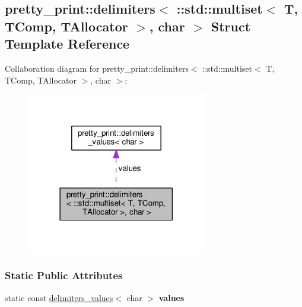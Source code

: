 \hypertarget{structpretty__print_1_1delimiters_3_01_1_1std_1_1multiset_3_01T_00_01TComp_00_01TAllocator_01_4_00_01char_01_4}{}\subsection{pretty\+\_\+print\+:\+:delimiters$<$ \+:\+:std\+:\+:multiset$<$ T, T\+Comp, T\+Allocator $>$, char $>$ Struct Template Reference}
\label{structpretty__print_1_1delimiters_3_01_1_1std_1_1multiset_3_01T_00_01TComp_00_01TAllocator_01_4_00_01char_01_4}


Collaboration diagram for pretty\+\_\+print\+:\+:delimiters$<$ \+:\+:std\+:\+:multiset$<$ T, T\+Comp, T\+Allocator $>$, char $>$\+:
\nopagebreak
\begin{figure}[H]
\begin{center}
\leavevmode
\includegraphics[width=222pt]{structpretty__print_1_1delimiters_3_01_1_1std_1_1multiset_3_01T_00_01TComp_00_01TAllocator_01_4_00_01char_01_4__coll__graph}
\end{center}
\end{figure}
\subsubsection*{Static Public Attributes}
\begin{DoxyCompactItemize}
\item 
static const \hyperlink{structpretty__print_1_1delimiters__values}{delimiters\+\_\+values}$<$ char $>$ {\bfseries values}\hypertarget{structpretty__print_1_1delimiters_3_01_1_1std_1_1multiset_3_01T_00_01TComp_00_01TAllocator_01_4_00_01char_01_4_a1519f24d4d3b7d4e0eeb73316c79bf35}{}\label{structpretty__print_1_1delimiters_3_01_1_1std_1_1multiset_3_01T_00_01TComp_00_01TAllocator_01_4_00_01char_01_4_a1519f24d4d3b7d4e0eeb73316c79bf35}

\end{DoxyCompactItemize}


